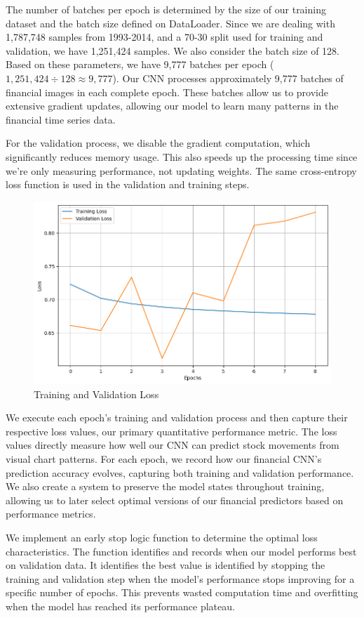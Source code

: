 \documentclass[12pt]{article}
\begin{document}
The number of batches per epoch is determined by the size of our training dataset and the batch size defined on DataLoader. Since we are dealing with 1,787,748 samples from 1993-2014, and a 70-30 split used for training and validation, we have 1,251,424 samples. We also consider the batch size of 128. Based on these parameters, we have 9,777 batches per epoch ($1,251,424 \div 128 \approx 9,777$). Our CNN processes approximately 9,777 batches of financial images in each complete epoch. These batches allow us to provide extensive gradient updates, allowing our model to learn many patterns in the financial time series data.

For the validation process, we disable the gradient computation, which significantly reduces memory usage. This also speeds up the processing time since we're only measuring performance, not updating weights. The same cross-entropy loss function is used in the validation and training steps.

\begin{figure}[h]
	\centering
	\includegraphics[width=.65\linewidth]{plots/training_validation.png}
	\caption{Training and Validation Loss}
	\label{fig:epoch_loss}
\end{figure}

We execute each epoch's training and validation process and then capture their respective loss values, our primary quantitative performance metric. The loss values directly measure how well our CNN can predict stock movements from visual chart patterns. For each epoch, we record how our financial CNN's prediction accuracy evolves, capturing both training and validation performance. We also create a system to preserve the model states throughout training, allowing us to later select optimal versions of our financial predictors based on performance metrics.

We implement an early stop logic function to determine the optimal loss characteristics. The function identifies and records when our model performs best on validation data. It identifies the best value is identified by stopping the training and validation step when the model's performance stops improving for a specific number of epochs. This prevents wasted computation time and overfitting when the model has reached its performance plateau.
\end{document}
